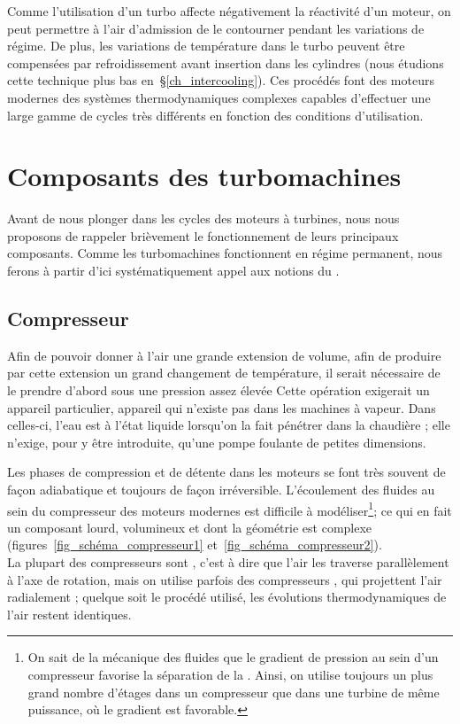 		Comme l’utilisation d’un turbo affecte négativement la réactivité d’un moteur, on peut permettre à l’air d’admission de le contourner pendant les variations de régime. De plus, les variations de température dans le turbo peuvent être compensées par refroidissement avant insertion dans les cylindres (nous étudions cette technique plus bas en~\S\ref{ch_intercooling}). Ces procédés font des moteurs modernes des systèmes thermodynamiques complexes capables d’effectuer une large gamme de cycles très différents en fonction des conditions d’utilisation.


\section{Composants des turbomachines}

	Avant de nous plonger dans les cycles des moteurs à turbines, nous nous proposons de rappeler brièvement le fonctionnement de leurs principaux composants. Comme les turbomachines fonctionnent en régime permanent, nous ferons à partir d’ici systématiquement appel aux notions du \courstrois.

	\subsection{Compresseur}
	
			Afin de pouvoir donner à l’air une grande extension de volume, afin de produire par cette extension un grand changement de température, il serait nécessaire de le prendre d’abord sous une pression assez élevée \jecourte Cette opération exigerait un appareil particulier, appareil qui n’existe pas dans les machines à vapeur. Dans celles-ci, l’eau est à l’état liquide lorsqu’on la fait pénétrer dans la chaudière ; elle n’exige, pour y être introduite, qu’une pompe foulante de petites dimensions.
	
		Les phases de compression et de détente dans les moteurs se font très souvent de façon adiabatique et toujours de façon irréversible. L’écoulement des fluides au sein du compresseur des moteurs modernes est difficile à modéliser\footnote{On sait de la mécanique des fluides que le gradient de pression au sein d’un compresseur favorise la séparation de la . Ainsi, on utilise toujours un plus grand nombre d’étages dans un compresseur que dans une turbine de même puissance, où le gradient est favorable.}\nolinebreak ; ce qui en fait un composant lourd, volumineux et dont la géométrie est complexe (figures~\ref{fig_schéma_compresseur1} et~\ref{fig_schéma_compresseur2}).\\
		La plupart des compresseurs sont , c’est à dire que l’air les traverse parallèlement à l’axe de rotation, mais on utilise parfois des compresseurs , qui projettent l’air radialement ; quelque soit le procédé utilisé, les évolutions thermodynamiques de l’air restent identiques.

